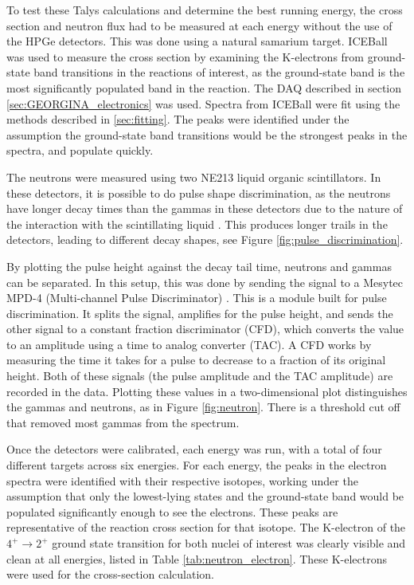 To test these Talys calculations and determine the best running energy, the cross section and neutron flux had to be measured at each energy without the use of the HPGe detectors. This was done using a natural samarium target. ICEBall was used to measure the cross section by examining the K-electrons from ground-state band transitions in the reactions of interest, as the ground-state band is the most significantly populated band in the reaction. The DAQ described in section \ref{sec:GEORGINA_electronics} was used. Spectra from ICEBall were fit using the methods described in \ref{sec:fitting}. The peaks were identified under the assumption the ground-state band transitions would be the strongest peaks in the spectra, and populate quickly. 

The neutrons were measured using two NE213 liquid organic scintillators. In these detectors, it is possible to do pulse shape discrimination, as the neutrons have longer decay times than the gammas in these detectors due to the nature of the interaction with the scintillating liquid \citep{knoll00:rad_det_meas}. This produces longer trails in the detectors, leading to different decay shapes, see Figure \ref{fig:pulse_discrimination}. 



By plotting the pulse height against the decay tail time, neutrons and gammas can be separated. In this setup, this was done by sending the signal to a Mesytec MPD-4 (Multi-channel Pulse Discriminator) \citep{mesytec:_PSD}. This is a module built for pulse discrimination. It splits the signal, amplifies for the pulse height, and sends the other signal to a constant fraction discriminator (CFD), which converts the value to an amplitude using a time to analog converter (TAC). A CFD works by measuring the time it takes for a pulse to decrease to a fraction of its original height. Both of these signals (the pulse amplitude and the TAC amplitude) are recorded in the data. Plotting these values in a two-dimensional plot distinguishes the gammas and neutrons, as in Figure \ref{fig:neutron}. There is a threshold cut off that removed most gammas from the spectrum.



Once the detectors were calibrated, each energy was run, with a total of four different targets across six energies. For each energy, the peaks in the electron spectra were identified with their respective isotopes, working under the assumption that only the lowest-lying states and the ground-state band would be populated significantly enough to see the electrons. These peaks are representative of the reaction cross section for that isotope. The K-electron of the $4^+\rightarrow2^+$ ground state transition for both nuclei of interest was clearly visible and clean at all energies, listed in Table \ref{tab:neutron_electron}. These K-electrons were used for the cross-section calculation.

